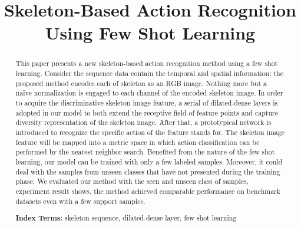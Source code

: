 \documentclass{bmvc2k}
\title{ Skeleton-Based Action Recognition\\ Using Few Shot Learning}
\begin{document}
\maketitle

\begin{abstract}
This paper presents a new skeleton-based action recognition method using a few shot learning. Consider the sequence data contain the temporal and spatial information; the proposed method encodes each of skeleton as an RGB image. Nothing more but a naïve normalization is engaged to each channel of the encoded skeleton image. In order to acquire the discriminative skeleton image feature, a serial of dilated-dense layers is adopted in our model to both extend the receptive field of feature points and capture diversity representation of the skeleton image. After that, a prototypical network is introduced to recognize the specific action of the feature stands for. The skeleton image feature will be mapped into a metric space in which action classification can be performed by the nearest neighbor search. Benefited from the nature of the few shot learning, our model can be trained with only a few labeled samples. Moreover, it could deal with the samples from unseen classes that have not presented during the training phase. We evaluated our method with the seen and unseen class of samples, experiment result shows, the method achieved comparable performance on benchmark datasets even with a few support samples.

\textbf{Index Terms:}
skeleton sequence, dilated-dense layer, few shot learning
\end{abstract}

\end{document}
